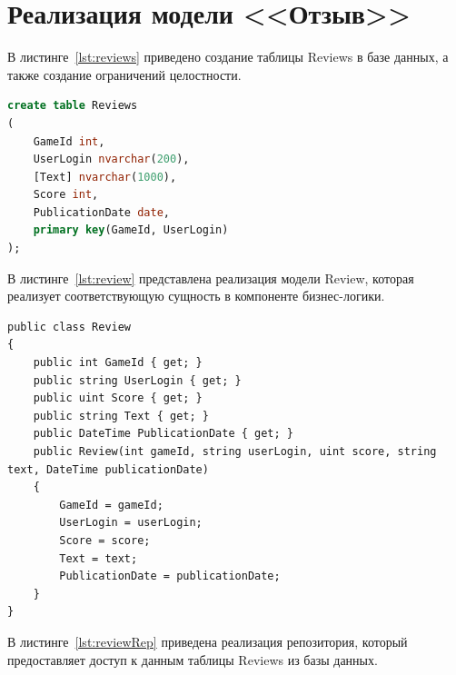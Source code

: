\section{Реализация модели <<Отзыв>>}

В листинге~\ref{lst:reviews} приведено создание таблицы Reviews в базе данных, а также создание ограничений целостности. 

\begin{lstlisting}[label=lst:reviews, caption=Таблица Reviews, language=SQL]
create table Reviews
(
	GameId int,
	UserLogin nvarchar(200),
	[Text] nvarchar(1000),
	Score int,
	PublicationDate date,
	primary key(GameId, UserLogin)
);
\end{lstlisting}

В листинге~\ref{lst:review} представлена реализация модели Review, которая реализует соответствующую сущность в компоненте бизнес-логики.

\begin{lstlisting}[label=lst:review, caption=Модель Review]
public class Review
{
	public int GameId { get; }
	public string UserLogin { get; }
	public uint Score { get; }
	public string Text { get; }
	public DateTime PublicationDate { get; }
	public Review(int gameId, string userLogin, uint score, string text, DateTime publicationDate)
	{
		GameId = gameId;
		UserLogin = userLogin;
		Score = score;
		Text = text;
		PublicationDate = publicationDate;
	}
}
\end{lstlisting}

В листинге~\ref{lst:reviewRep} приведена реализация репозитория, который предоставляет доступ к данным таблицы Reviews из базы данных. 

